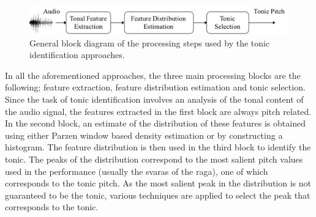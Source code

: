 \begin{figure}
	\begin{center}
		\includegraphics[width=\figSizeNinetyFive]{ch02_background/figures/tonic_identification_block_diagram.pdf}
	\end{center}
	\caption[General block diagram of the tonic identification approaches]{General block diagram of the processing steps used by the tonic identification approaches.}
	\label{fig:tonic_identification_general_block_diagram}
\end{figure}

In all the aforementioned approaches, the three main processing blocks are the following; feature extraction, feature distribution estimation and tonic selection. Since the task of tonic identification involves an analysis of the tonal content of the audio signal, the features extracted in the first block are always pitch related. In the second block, an estimate of the distribution of these features is obtained using either Parzen window based density estimation or by constructing a histogram. The feature distribution is then used in the third block to identify the tonic. The peaks of the distribution correspond to the most salient pitch values used in the performance (usually the \glspl{svara} of the \gls{raga}), one of which corresponds to the tonic pitch. As the most salient peak in the distribution is not guaranteed to be the tonic, various techniques are applied to select the peak that corresponds to the tonic.



